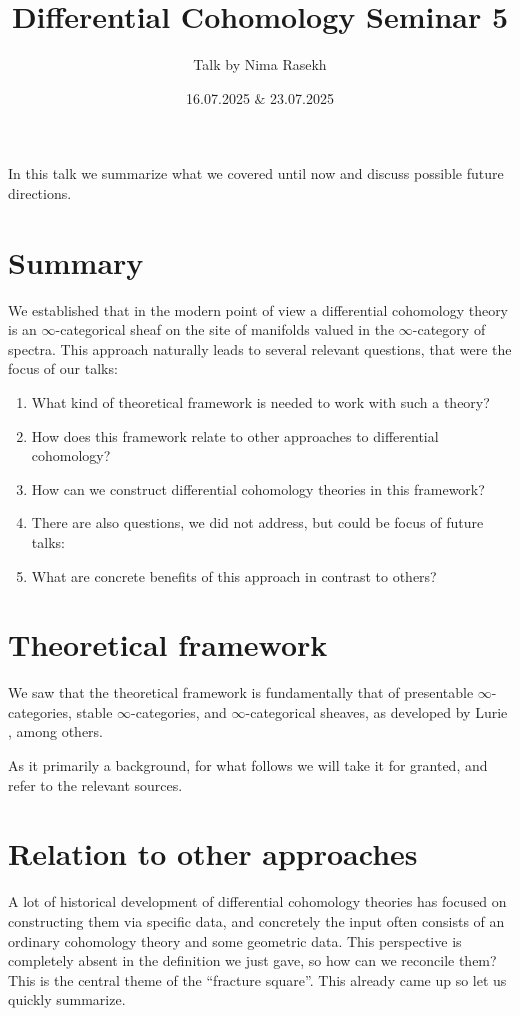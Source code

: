 \documentclass[10pt]{amsart}
\title{Differential Cohomology Seminar 5}
\date{16.07.2025 $\&$ 23.07.2025}
\author{Talk by Nima Rasekh}
\theoremstyle{definition}
\theoremstyle{remark}
\numberwithin{equation}{section}
\begin{document}
\maketitle

In this talk we summarize what we covered until now and discuss possible future directions.

\section {Summary}
We established that in the modern point of view a differential cohomology theory is an $\infty$-categorical sheaf on the site of manifolds valued in the $\infty$-category of spectra. This approach naturally leads to several relevant questions, that were the focus of our talks:
\begin{enumerate}
  \item What kind of theoretical framework is needed to work with such a theory?
  \item How does this framework relate to other approaches to differential cohomology?
  \item How can we construct differential cohomology theories in this framework?
  \item[] There are also questions, we did not address, but could be focus of future talks:
  \item What are concrete benefits of this approach in contrast to others?
\end{enumerate} 

\section{Theoretical framework}
We saw that the theoretical framework is fundamentally that of presentable $\infty$-categories, stable $\infty$-categories, and $\infty$-categorical sheaves, as developed by Lurie \cite{lurie2009htt}, among others. 

As it primarily a background, for what follows we will take it for granted, and refer to the relevant sources.

\section{Relation to other approaches}
A lot of historical development of differential cohomology theories has focused on constructing them via specific data, and concretely the input often consists of an ordinary cohomology theory and some geometric data. This perspective is completely absent in the definition we just gave, so how can we reconcile them? This is the central theme of the ``fracture square''. This already came up so let us quickly summarize.
\end{document}
